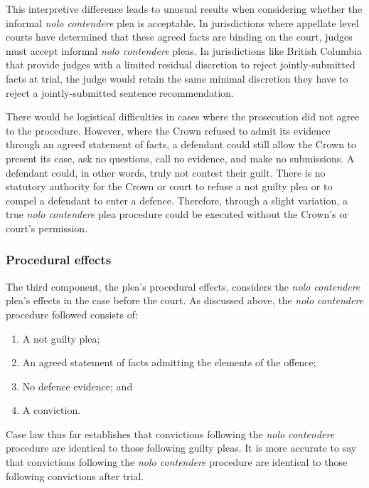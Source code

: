 This interpretive difference leads to unusual results when considering whether the informal \textit{nolo contendere} plea is acceptable. In jurisdictions where appellate level courts have determined that these agreed facts are binding on the court, judges must accept informal \textit{nolo contendere} pleas. In jurisdictions like British Columbia that provide judges with a limited residual discretion to reject jointly-submitted facts at trial, the judge would retain the same minimal discretion they have to reject a jointly-submitted sentence recommendation.

There would be logistical difficulties in cases where the prosecution did not agree to the procedure. However, where the Crown refused to admit its evidence through an agreed statement of facts, a defendant could still allow the Crown to present its case, ask no questions, call no evidence, and make no submissions. A defendant could, in other words, truly not contest their guilt. There is no statutory authority for the Crown or court to refuse a not guilty plea or to compel a defendant to enter a defence. Therefore, through a slight variation, a true \textit{nolo contendere} plea procedure could be executed without the Crown's or court's permission.

\subsubsection{Procedural effects\\}

The third component, the plea's procedural effects, considers the \textit{nolo contendere} plea's effects in the case before the court. As discussed above, the \textit{nolo contendere} procedure followed consists of:

\begin{enumerate}
    \item A not guilty plea;
    \item An agreed statement of facts admitting the elements of the offence;
    \item No defence evidence; and
    \item A conviction.
\end{enumerate}

Case law thus far establishes that convictions following the \textit{nolo contendere} procedure are identical to those following guilty pleas. It is more accurate to say that convictions following the \textit{nolo contendere} procedure are identical to those following convictions after trial.

